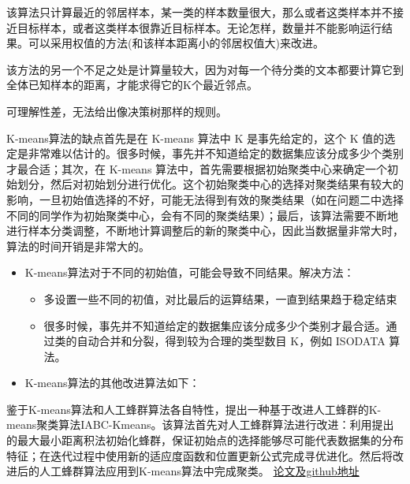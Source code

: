 \documentclass[11pt]{article}
\begin{document}
    该算法只计算最近的邻居样本，某一类的样本数量很大，那么或者这类样本并不接近目标样本，或者这类样本很靠近目标样本。无论怎样，数量并不能影响运行结果。可以采用权值的方法(和该样本距离小的邻居权值大)来改进。

    该方法的另一个不足之处是计算量较大，因为对每一个待分类的文本都要计算它到全体已知样本的距离，才能求得它的K个最近邻点。

可理解性差，无法给出像决策树那样的规则。

    K-means算法的缺点首先是在 K-means 算法中 K 是事先给定的，这个 K
值的选定是非常难以估计的。很多时候，事先并不知道给定的数据集应该分成多少个类别才最合适；其次，在
K-means
算法中，首先需要根据初始聚类中心来确定一个初始划分，然后对初始划分进行优化。这个初始聚类中心的选择对聚类结果有较大的影响，一旦初始值选择的不好，可能无法得到有效的聚类结果（如在问题二中选择不同的同学作为初始聚类中心，会有不同的聚类结果）；最后，该算法需要不断地进行样本分类调整，不断地计算调整后的新的聚类中心，因此当数据量非常大时，算法的时间开销是非常大的。

\begin{itemize}
\item
  K-means算法对于不同的初始值，可能会导致不同结果。解决方法：

  \begin{itemize}
  \item
    多设置一些不同的初值，对比最后的运算结果，一直到结果趋于稳定结束
  \item
    很多时候，事先并不知道给定的数据集应该分成多少个类别才最合适。通过类的自动合并和分裂，得到较为合理的类型数目
    K，例如 ISODATA 算法。
  \end{itemize}
\item
  K-means算法的其他改进算法如下：
\end{itemize}

鉴于K-means算法和人工蜂群算法各自特性，提出一种基于改进人工蜂群的K-means聚类算法IABC-Kmeans。该算法首先对人工蜂群算法进行改进：利用提出的最大最小距离积法初始化蜂群，保证初始点的选择能够尽可能代表数据集的分布特征；在迭代过程中使用新的适应度函数和位置更新公式完成寻优进化。然后将改进后的人工蜂群算法应用到K-means算法中完成聚类。
\href{https://github.com/DMinerJackie/IABC-KMC}{论文及github地址}


    
    
    
\end{document}
